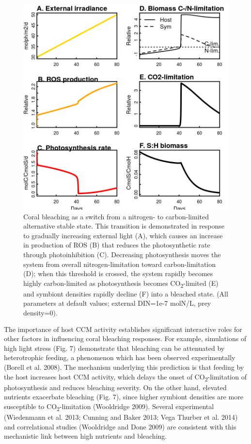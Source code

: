 \documentclass[]{elsarticle} %
\makeatletter
\def\maxwidth{\ifdim\Gin@nat@width>\linewidth\linewidth
\else\Gin@nat@width\fi}
\let\Oldincludegraphics\includegraphics
\renewcommand{\includegraphics}[1]{\Oldincludegraphics[width=\maxwidth]{#1}}
\makeatother
\begin{document}
\begin{figure}[htbp]
\centering
\includegraphics{../img/Fig6.png}
\caption{Coral bleaching as a switch from a nitrogen- to carbon-limited
alternative stable state. This transition is demonstrated in response to
gradually increasing external light (A), which causes an increase in
production of ROS (B) that reduces the photosynthetic rate through
photoinhibition (C). Decreasing photosynthesis moves the system from
overall nitrogen-limitation toward carbon-limitation (D); when this
threshold is crossed, the system rapidly becomes highly carbon-limited
as photosynthesis becomes CO\textsubscript{2}-limited (E) and symbiont
densities rapidly decline (F) into a bleached state. (All parameters at
default values; external DIN=1e-7 molN/L, prey density=0).}
\end{figure}

The importance of host CCM activity establishes significant interactive
roles for other factors in influencing coral bleaching responses. For
example, simulations of high light stress (Fig. 7) demonstrate that
bleaching can be attenuated by heterotrophic feeding, a phenomenon which
has been observed experimentally (Borell et al. 2008). The mechanism
underlying this prediction is that feeding by the host increases host
CCM activity, which delays the onset of CO\textsubscript{2}-limitation
of photosynthesis and reduces bleaching severity. On the other hand,
elevated nutrients exacerbate bleaching (Fig. 7), since higher symbiont
densities are more susceptible to CO\textsubscript{2}-limitation
(Wooldridge 2009). Several experimental (Wiedenmann et al. 2013; Cunning
and Baker 2013; Vega Thurber et al. 2014) and correlational studies
(Wooldridge and Done 2009) are consistent with this mechanistic link
between high nutrients and bleaching.
\end{document}
